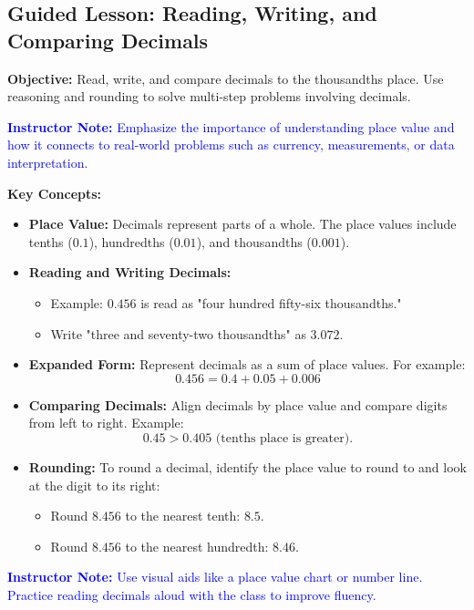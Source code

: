 \documentclass[12pt]{article}
\title{}
\date{}
\begin{document}
\subsection*{Guided Lesson: Reading, Writing, and Comparing Decimals}
\onehalfspacing

\begin{tcolorbox}[colframe=black!40, colback=gray!5, 
coltitle=black, colbacktitle=black!20, fonttitle=\bfseries\Large, 
title=Learning Objective, halign title=center, left=5pt, right=5pt, top=5pt, bottom=15pt]
\textbf{Objective:} Read, write, and compare decimals to the thousandths place. Use reasoning and rounding to solve multi-step problems involving decimals.

\textcolor{blue}{\textbf{Instructor Note:} Emphasize the importance of understanding place value and how it connects to real-world problems such as currency, measurements, or data interpretation.}
\end{tcolorbox}

\vspace{1em}

\begin{tcolorbox}[colframe=black!60, colback=white, 
coltitle=black, colbacktitle=black!15, fonttitle=\bfseries\Large, 
title=Key Concepts and Vocabulary, halign title=center, left=10pt, right=10pt, top=10pt, bottom=15pt]
\textbf{Key Concepts:}
\begin{itemize}
    \item \textbf{Place Value:} Decimals represent parts of a whole. The place values include tenths (\(0.1\)), hundredths (\(0.01\)), and thousandths (\(0.001\)).
    \item \textbf{Reading and Writing Decimals:} 
    \begin{itemize}
        \item Example: \(0.456\) is read as "four hundred fifty-six thousandths."
        \item Write "three and seventy-two thousandths" as \(3.072\).
    \end{itemize}
    \item \textbf{Expanded Form:} Represent decimals as a sum of place values. For example:
    \[ 0.456 = 0.4 + 0.05 + 0.006 \]
    \item \textbf{Comparing Decimals:} Align decimals by place value and compare digits from left to right. Example:
    \[ 0.45 > 0.405 \text{ (tenths place is greater)}. \]
    \item \textbf{Rounding:} To round a decimal, identify the place value to round to and look at the digit to its right:
    \begin{itemize}
        \item Round \(8.456\) to the nearest tenth: \(8.5\).
        \item Round \(8.456\) to the nearest hundredth: \(8.46\).
    \end{itemize}
\end{itemize}

\textcolor{blue}{\textbf{Instructor Note:} Use visual aids like a place value chart or number line. Practice reading decimals aloud with the class to improve fluency.}
\end{tcolorbox}
\end{document}
